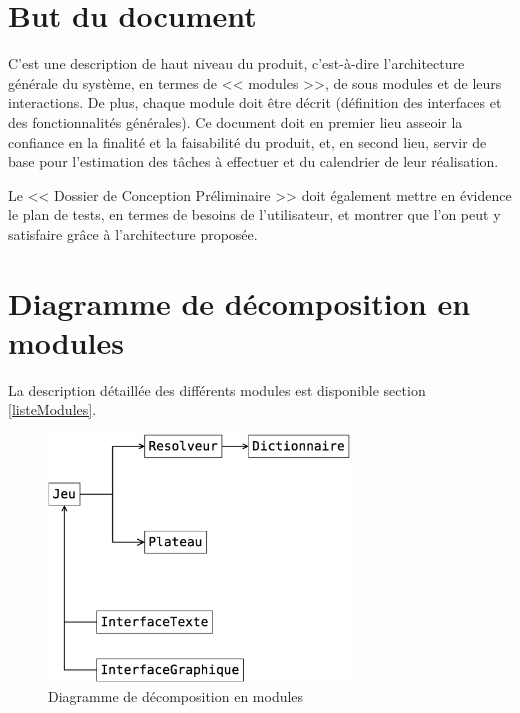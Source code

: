 \documentclass[12pt,a4paper,openany]{article}
\begin{document}
	\setcounter{tocdepth}{2}
	\setcounter{secnumdepth}{3}
	\maketitle
	\tableofcontents
	\newpage
	\section{But du document}
	C'est une description de haut niveau du produit, c'est-à-dire l'architecture générale du système, en termes de << modules >>, de sous modules et de leurs
	interactions. De plus, chaque module doit être décrit (définition des interfaces et des fonctionnalités générales). Ce document doit en premier lieu asseoir
	la confiance en la finalité et la faisabilité du produit, et, en second lieu, servir de base pour l'estimation des tâches à effectuer et du calendrier de
	leur réalisation.

	Le << Dossier de Conception Préliminaire >> doit également mettre en évidence le plan de tests, en termes de besoins de l'utilisateur, et montrer que l'on peut
	y satisfaire grâce à l'architecture proposée.
	\section{Diagramme de décomposition en modules}\label{diagModules}
	La description détaillée des différents modules est disponible section \ref{listeModules}. 
	\begin{figure}[H]
		\centering
		\includegraphics[width=8cm]{diagrammeModules.eps}
		\caption{Diagramme de décomposition en modules}
	\end{figure}
\end{document}
